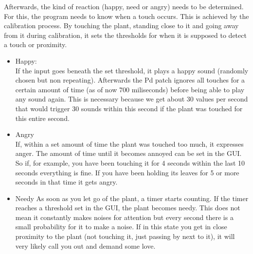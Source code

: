 Afterwards, the kind of reaction (happy, need or angry) needs to be determined. For this, the program needs to know when a touch occurs. This is achieved by the calibration process. By touching the plant, standing close to it and going away from it during calibration, it sets the thresholds for when it is supposed to detect a touch or proximity.
\begin{itemize}
\item Happy:\\
If the input goes beneath the set threshold, it plays a happy sound (randomly chosen but non repeating). Afterwards the Pd patch ignores all touches for a certain amount of time (as of now 700 miliseconds) before being able to play any sound again. This is necessary because we get about 30 values per second that would trigger 30 sounds within this second if the plant was touched for this entire second.
\item Angry\\
If, within a set amount of time the plant was touched too much, it expresses anger. The amount of time until it becomes annoyed can be set in the GUI. So if, for example, you have been touching it for 4 seconds within the last 10 seconds everything is fine. If you have been holding its leaves for 5 or more seconds in that time it gets angry.
\item Needy
As soon as you let go of the plant, a timer starts counting. If the timer reaches a threshold set in the GUI, the plant becomes needy. This does not mean it constantly makes noises for attention but every second there is a small probability for it to make a noise. If in this state you get in close proximity to the plant (not touching it, just passing by next to it), it will very likely call you out and demand some love.
\end{itemize}

